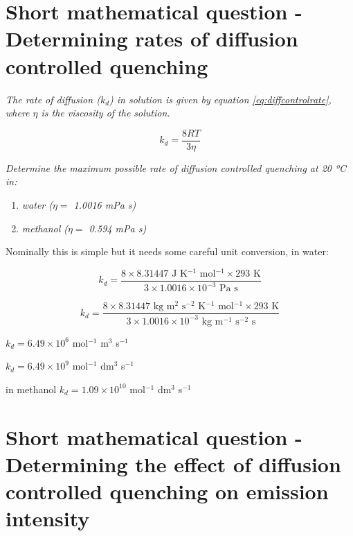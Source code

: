 \documentclass[
]{book}
\providecommand{\tightlist}{%
  \setlength{\itemsep}{0pt}\setlength{\parskip}{0pt}}
\begin{document}
\hypertarget{sec:diffcontrol}{%
\section{Short mathematical question - Determining rates of diffusion controlled quenching}\label{sec:diffcontrol}}

\emph{The rate of diffusion (\(k_d\)) in solution is given by equation \eqref{eq:diffcontrolrate}, where \(\eta\) is the viscosity of the solution.}

\begin{equation}
k_d = \frac{8RT}{3 \eta}
\label{eq:diffcontrolrate}
\end{equation}

\emph{Determine the maximum possible rate of diffusion controlled quenching at 20 ºC in:}

\begin{enumerate}
\def\labelenumi{\alph{enumi}.}
\tightlist
\item
  \emph{water (\(\eta=\) 1.0016 mPa s)}
\item
  \emph{methanol (\(\eta=\) 0.594 mPa s)}
\end{enumerate}

Nominally this is simple but it needs some careful unit conversion, in water:

\begin{equation*}
k_d = \frac{8 \times 8.31447 \textrm { J K$^{-1}$ mol$^{-1}$} \times 293 \textrm{ K}}{3 \times 1.0016 \times 10^{-3} \textrm{ Pa s}}
\end{equation*}

\begin{equation*}
k_d = \frac{8 \times 8.31447 \textrm { kg m$^2$ s$^{-2}$ K$^{-1}$ mol$^{-1}$} \times 293 \textrm{ K}}{3 \times 1.0016 \times 10^{-3} \textrm{ kg m$^{-1}$ s$^{-2}$ s}}
\end{equation*}

\(k_d= 6.49 \times 10^6\) mol\(^{-1}\) m\(^3\) s\(^{-1}\)

\(k_d= 6.49 \times 10^9\) mol\(^{-1}\) dm\(^3\) s\(^{-1}\)

in methanol \(k_d= 1.09 \times 10^{10}\) mol\(^{-1}\) dm\(^3\) s\(^{-1}\)

\hypertarget{sec:emintquench}{%
\section{Short mathematical question - Determining the effect of diffusion controlled quenching on emission intensity}\label{sec:emintquench}}
\end{document}
